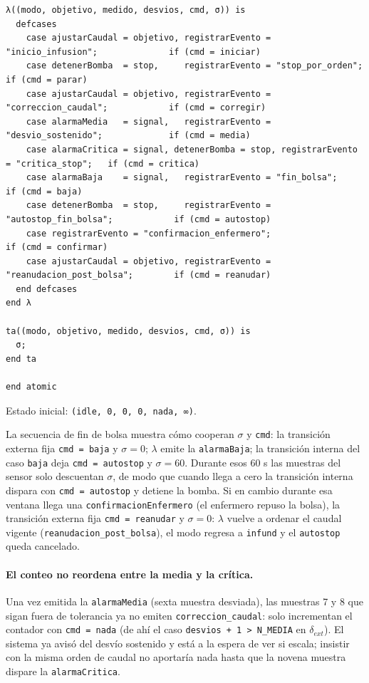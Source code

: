 \documentclass[11pt,a4paper]{article}
\begin{document}
\begin{lstlisting}[style=cml]
λ((modo, objetivo, medido, desvios, cmd, σ)) is
  defcases
    case ajustarCaudal = objetivo, registrarEvento = "inicio_infusion";              if (cmd = iniciar)
    case detenerBomba  = stop,     registrarEvento = "stop_por_orden";               if (cmd = parar)
    case ajustarCaudal = objetivo, registrarEvento = "correccion_caudal";            if (cmd = corregir)
    case alarmaMedia   = signal,   registrarEvento = "desvio_sostenido";             if (cmd = media)
    case alarmaCritica = signal, detenerBomba = stop, registrarEvento = "critica_stop";   if (cmd = critica)
    case alarmaBaja    = signal,   registrarEvento = "fin_bolsa";                     if (cmd = baja)
    case detenerBomba  = stop,     registrarEvento = "autostop_fin_bolsa";            if (cmd = autostop)
    case registrarEvento = "confirmacion_enfermero";                                  if (cmd = confirmar)
    case ajustarCaudal = objetivo, registrarEvento = "reanudacion_post_bolsa";        if (cmd = reanudar)
  end defcases
end λ

ta((modo, objetivo, medido, desvios, cmd, σ)) is
  σ;
end ta

end atomic
\end{lstlisting}

\noindent Estado inicial: \texttt{(idle, 0, 0, 0, nada, ∞)}.

La secuencia de fin de bolsa muestra cómo cooperan $\sigma$ y \texttt{cmd}: la transición externa fija \texttt{cmd = baja} y $\sigma = 0$; $\lambda$ emite la \texttt{alarmaBaja}; la transición interna del caso \texttt{baja} deja \texttt{cmd = autostop} y $\sigma = 60$. Durante esos 60 s las muestras del sensor solo descuentan $\sigma$, de modo que cuando llega a cero la transición interna dispara con \texttt{cmd = autostop} y detiene la bomba. Si en cambio durante esa ventana llega una \texttt{confirmacion\-Enfermero} (el enfermero repuso la bolsa), la transición externa fija \texttt{cmd = reanudar} y $\sigma = 0$: $\lambda$ vuelve a ordenar el caudal vigente (\texttt{reanudacion\_post\_bolsa}), el modo regresa a \texttt{infund} y el \texttt{autostop} queda cancelado.

\paragraph{El conteo no reordena entre la media y la crítica.} Una vez emitida la \texttt{alarmaMedia} (sexta muestra desviada), las muestras 7 y 8 que sigan fuera de tolerancia ya no emiten \texttt{correccion\_caudal}: solo incrementan el contador con \texttt{cmd = nada} (de ahí el caso \texttt{desvios + 1 > N\_MEDIA} en $\delta_{ext}$). El sistema ya avisó del desvío sostenido y está a la espera de ver si escala; insistir con la misma orden de caudal no aportaría nada hasta que la novena muestra dispare la \texttt{alarmaCritica}.
\end{document}
